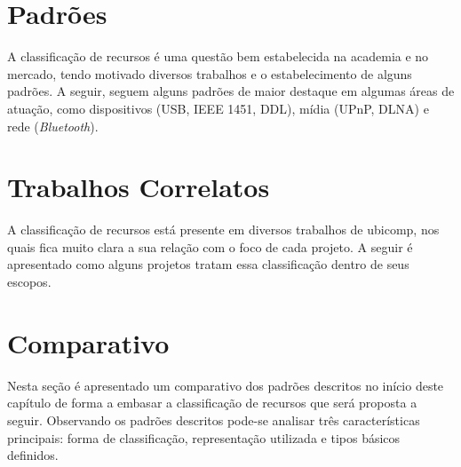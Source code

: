 \section{Padrões}
\label{sec:padroes}

A classificação de recursos é uma questão bem estabelecida na academia e no mercado, tendo motivado diversos trabalhos e o estabelecimento de alguns padrões. A seguir, seguem alguns padrões de maior destaque em algumas áreas de atuação, como dispositivos (USB, IEEE 1451, DDL), mídia (UPnP, DLNA) e rede (\emph{Bluetooth}).








\section{Trabalhos Correlatos}
\label{sec:correlatos}

A classificação de recursos está presente em diversos trabalhos de ubicomp, nos quais fica muito clara a sua relação com o foco de cada projeto. A seguir é apresentado como alguns projetos tratam essa classificação dentro de seus escopos.






\section{Comparativo}
\label{sec:comparativo}

Nesta seção é apresentado um comparativo dos padrões descritos no início deste capítulo de forma a embasar a classificação de recursos que será proposta a seguir. Observando os padrões descritos pode-se analisar três características principais: forma de classificação, representação utilizada e tipos básicos definidos. 

